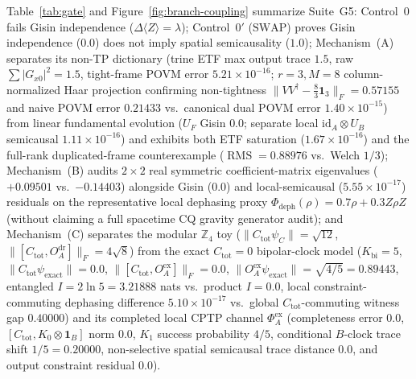 \documentclass[11pt,a4paper]{article}
\theoremstyle{definition}
\theoremstyle{remark}
\newcommand{\id}{\mathrm{id}}
\newcommand{\RMS}{\operatorname{RMS}}
\newcommand{\bbZ}{\mathbb{Z}}
\newcommand{\1}{\mathbf{1}}
\begin{document}
Table~\ref{tab:gate} and Figure~\ref{fig:branch-coupling} summarize Suite~G5: Control~0 fails Gisin independence ($\Delta\langle Z\rangle=\lambda$); Control~0$'$ ($\mathrm{SWAP}$) proves Gisin independence ($0.0$) does not imply spatial semicausality ($1.0$); Mechanism~(A) separates its non-TP dictionary (trine ETF max output trace $1.5$, raw $\sum|G_{x0}|^2=1.5$, tight-frame POVM error $5.21\times 10^{-16}$; $r=3,M=8$ column-normalized Haar projection confirming non-tightness $\|VV^\dagger-\frac{8}{3}\1_3\|_F=0.57155$ and naive POVM error $0.21433$ vs.\ canonical dual POVM error $1.40\times 10^{-15}$) from linear fundamental evolution ($U_F$ Gisin $0.0$; separate local $\id_A\otimes U_B$ semicausal $1.11\times 10^{-16}$) and exhibits both ETF saturation ($1.67\times 10^{-16}$) and the full-rank duplicated-frame counterexample ($\RMS=0.88976$ vs.\ Welch $1/3$); Mechanism~(B) audits $2\times 2$ real symmetric coefficient-matrix eigenvalues ($+0.09501$ vs.\ $-0.14403$) alongside Gisin ($0.0$) and local-semicausal ($5.55\times 10^{-17}$) residuals on the representative local dephasing proxy $\Phi_{\mathrm{deph}}(\rho)=0.7\rho+0.3 Z\rho Z$ (without claiming a full spacetime CQ gravity generator audit); and Mechanism~(C) separates the modular $\bbZ_4$ toy ($\|C_{\mathrm{tot}}\psi_C\|=\sqrt{12}$, $\|[C_{\mathrm{tot}},O_A^{\mathrm{dr}}]\|_F=4\sqrt{8}$) from the exact $C_{\mathrm{tot}}=0$ bipolar-clock model ($K_{\mathrm{bi}}=5$, $\|C_{\mathrm{tot}}\psi_{\mathrm{exact}}\|=0.0$, $\|[C_{\mathrm{tot}},O_A^{\mathrm{ex}}]\|_F=0.0$, $\|O_A^{\mathrm{ex}}\psi_{\mathrm{exact}}\|=\sqrt{4/5}=0.89443$, entangled $I=2\ln 5=3.21888$ nats vs.\ product $I=0.0$, local constraint-commuting dephasing difference $5.10\times 10^{-17}$ vs.\ global $C_{\mathrm{tot}}$-commuting witness gap $0.40000$) and its completed local CPTP channel $\Phi_A^{\mathrm{ex}}$ (completeness error $0.0$, $[C_{\mathrm{tot}},K_0\otimes\1_B]$ norm $0.0$, $K_1$ success probability $4/5$, conditional $B$-clock trace shift $1/5=0.20000$, non-selective spatial semicausal trace distance $0.0$, and output constraint residual $0.0$).
\end{document}
